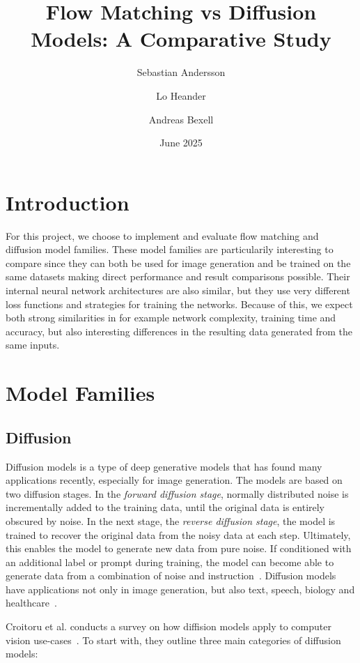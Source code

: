 \documentclass{article}
\title{Flow Matching vs Diffusion Models: A Comparative Study}
\author{Sebastian Andersson \and Lo Heander \and Andreas Bexell}
\date{June 2025}
\begin{document}
\maketitle

\section{Introduction}

For this project, we choose to implement and evaluate flow matching and diffusion model families. These model families are particularily interesting to compare since they can both be used for image generation and be trained on the same datasets making direct performance and result comparisons possible. Their internal neural network architectures are also similar, but they use very different loss functions and strategies for training the networks. Because of this, we expect both strong similarities in for example network complexity, training time and accuracy, but also interesting differences in the resulting data generated from the same inputs.

\section{Model Families}

\subsection{Diffusion}

Diffusion models is a type of deep generative models that has found many applications recently, especially for image generation. The models are based on two diffusion stages. In the \emph{forward diffusion stage}, normally distributed noise is incrementally added to the training data, until the original data is entirely obscured by noise. In the next stage, the \emph{reverse diffusion stage}, the model is trained to recover the original data from the noisy data at each step. Ultimately, this enables the model to generate new data from pure noise. If conditioned with an additional label or prompt during training, the model can become able to generate data from a combination of noise and instruction~\cite{croitoru2023diffusion,yang2023diffusion}. Diffusion models have applications not only in image generation, but also text, speech, biology and healthcare~\cite{cao2024survey}.

Croitoru et al. conducts a survey on how diffision models apply to computer vision use-cases~\cite{croitoru2023diffusion}. To start with, they outline three main categories of diffusion models:
\end{document}
